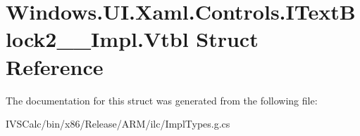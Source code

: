 \hypertarget{struct_windows_1_1_u_i_1_1_xaml_1_1_controls_1_1_i_text_block2_____impl_1_1_vtbl}{}\section{Windows.\+U\+I.\+Xaml.\+Controls.\+I\+Text\+Block2\+\_\+\+\_\+\+Impl.\+Vtbl Struct Reference}
\label{struct_windows_1_1_u_i_1_1_xaml_1_1_controls_1_1_i_text_block2_____impl_1_1_vtbl}


The documentation for this struct was generated from the following file\+:\begin{DoxyCompactItemize}
\item 
I\+V\+S\+Calc/bin/x86/\+Release/\+A\+R\+M/ilc/Impl\+Types.\+g.\+cs\end{DoxyCompactItemize}
